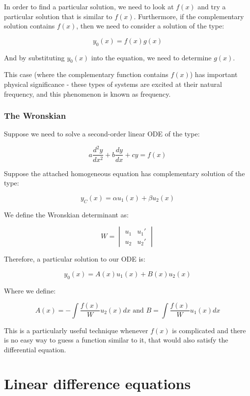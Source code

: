 \documentclass[12pt]{article}
\begin{document}
In order to find a particular solution, we need to look at $f(x)$ and try a particular solution that is similar to $f(x)$. Furthermore, if the complementary solution contains $f(x)$, then we need to consider a solution of the type:

\[ y_0(x) = f(x)g(x) \]

And by substituting $y_0(x)$ into the equation, we need to determine $g(x)$.

This case (where the complementary function contains $f(x)$) has important physical significance - these types of systems are excited at their natural frequency, and this phenomenon is known as frequency.

\subsubsection{The Wronskian}

Suppose we need to solve a second-order linear ODE of the type:

\[ a\frac{d^2y}{dx^2} + b\frac{dy}{dx} + cy = f(x) \]

\begin{theorem}
    Suppose the attached homogeneous equation has complementary solution of the type:

    \[ y_C(x) = \alpha u_1(x) + \beta u_2(x) \]

    We define the Wronskian determinant as:

    \[ W = \begin{vmatrix}
        u_1 & u_1' \\
        u_2 & u_2'
    \end{vmatrix} \]

    Therefore, a particular solution to our ODE is:

    \[ y_0(x) = A(x)u_1(x) + B(x)u_2(x) \]

    Where we define:

    \[ A(x) = -\int \frac{f(x)}{W}u_2(x) dx \text{   and   } B = \int \frac{f(x)}{W}u_1(x) dx \]
\end{theorem}

This is a particularly useful technique whenever $f(x)$ is complicated and there is no easy way to guess a function similar to it, that would also satisfy the differential equation.

\newpage

\section{Linear difference equations}
\end{document}
